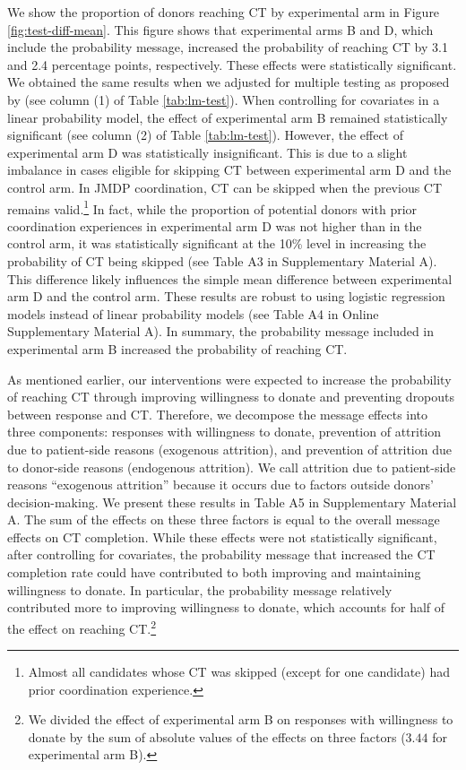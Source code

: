 \documentclass[12pt, a4paper]{article}
\begin{document}
We show the proportion of donors reaching CT by experimental arm in Figure \ref{fig:test-diff-mean}. This figure shows that experimental arms B and D, which include the probability message, increased the probability of reaching CT by 3.1 and 2.4 percentage points, respectively. These effects were statistically significant. We obtained the same results when we adjusted for multiple testing as proposed by \citet{List2019} (see column (1) of Table \ref{tab:lm-test}). When controlling for covariates in a linear probability model, the effect of experimental arm B remained statistically significant (see column (2) of Table \ref{tab:lm-test}). However, the effect of experimental arm D was statistically insignificant. This is due to a slight imbalance in cases eligible for skipping CT between experimental arm D and the control arm. In JMDP coordination, CT can be skipped when the previous CT remains valid.\footnote{Almost all candidates whose CT was skipped (except for one candidate) had prior coordination experience.} In fact, while the proportion of potential donors with prior coordination experiences in experimental arm D was not higher than in the control arm, it was statistically significant at the 10\% level in increasing the probability of CT being skipped (see Table A3 in Supplementary Material A). This difference likely influences the simple mean difference between experimental arm D and the control arm. These results are robust to using logistic regression models instead of linear probability models (see Table A4 in Online Supplementary Material A). In summary, the probability message included in experimental arm B increased the probability of reaching CT.

As mentioned earlier, our interventions were expected to increase the probability of reaching CT through improving willingness to donate and preventing dropouts between response and CT. Therefore, we decompose the message effects into three components: responses with willingness to donate, prevention of attrition due to patient-side reasons (exogenous attrition), and prevention of attrition due to donor-side reasons (endogenous attrition). We call attrition due to patient-side reasons ``exogenous attrition'' because it occurs due to factors outside donors' decision-making. We present these results in Table A5 in Supplementary Material A. The sum of the effects on these three factors is equal to the overall message effects on CT completion. While these effects were not statistically significant, after controlling for covariates, the probability message that increased the CT completion rate could have contributed to both improving and maintaining willingness to donate. In particular, the probability message relatively contributed more to improving willingness to donate, which accounts for half of the effect on reaching CT.\footnote{We divided the effect of experimental arm B on responses with willingness to donate by the sum of absolute values of the effects on three factors (\(3.44\) for experimental arm B).}
\end{document}
